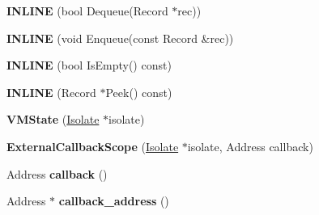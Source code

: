 \begin{DoxyCompactItemize}
\item 
\hypertarget{classv8_1_1internal_1_1_b_a_s_e___e_m_b_e_d_d_e_d_aef824c3518e458f78453d4411fa13506}{}{\bfseries I\+N\+L\+I\+N\+E} (bool Dequeue(Record $\ast$rec))\label{classv8_1_1internal_1_1_b_a_s_e___e_m_b_e_d_d_e_d_aef824c3518e458f78453d4411fa13506}

\item 
\hypertarget{classv8_1_1internal_1_1_b_a_s_e___e_m_b_e_d_d_e_d_a88bd08ad68d4123e4cb879cd97bbbca2}{}{\bfseries I\+N\+L\+I\+N\+E} (void Enqueue(const Record \&rec))\label{classv8_1_1internal_1_1_b_a_s_e___e_m_b_e_d_d_e_d_a88bd08ad68d4123e4cb879cd97bbbca2}

\item 
\hypertarget{classv8_1_1internal_1_1_b_a_s_e___e_m_b_e_d_d_e_d_af2249fffca0874ecc67ea0967f191615}{}{\bfseries I\+N\+L\+I\+N\+E} (bool Is\+Empty() const)\label{classv8_1_1internal_1_1_b_a_s_e___e_m_b_e_d_d_e_d_af2249fffca0874ecc67ea0967f191615}

\item 
\hypertarget{classv8_1_1internal_1_1_b_a_s_e___e_m_b_e_d_d_e_d_a4947bbfad3c24aed7956dd612ee75b25}{}{\bfseries I\+N\+L\+I\+N\+E} (Record $\ast$Peek() const)\label{classv8_1_1internal_1_1_b_a_s_e___e_m_b_e_d_d_e_d_a4947bbfad3c24aed7956dd612ee75b25}

\item 
\hypertarget{classv8_1_1internal_1_1_b_a_s_e___e_m_b_e_d_d_e_d_a2538f9d418fda6abd28c54bc6ae3c9ae}{}{\bfseries V\+M\+State} (\hyperlink{classv8_1_1internal_1_1_isolate}{Isolate} $\ast$isolate)\label{classv8_1_1internal_1_1_b_a_s_e___e_m_b_e_d_d_e_d_a2538f9d418fda6abd28c54bc6ae3c9ae}

\item 
\hypertarget{classv8_1_1internal_1_1_b_a_s_e___e_m_b_e_d_d_e_d_a19859af169553b44163bdaa766516c32}{}{\bfseries External\+Callback\+Scope} (\hyperlink{classv8_1_1internal_1_1_isolate}{Isolate} $\ast$isolate, Address callback)\label{classv8_1_1internal_1_1_b_a_s_e___e_m_b_e_d_d_e_d_a19859af169553b44163bdaa766516c32}

\item 
\hypertarget{classv8_1_1internal_1_1_b_a_s_e___e_m_b_e_d_d_e_d_aa4942df0d30d465c2fa57a7dd5a3b9f9}{}Address {\bfseries callback} ()\label{classv8_1_1internal_1_1_b_a_s_e___e_m_b_e_d_d_e_d_aa4942df0d30d465c2fa57a7dd5a3b9f9}

\item 
\hypertarget{classv8_1_1internal_1_1_b_a_s_e___e_m_b_e_d_d_e_d_a33647f94221caac945ccd3f9fd1adc54}{}Address $\ast$ {\bfseries callback\+\_\+address} ()\label{classv8_1_1internal_1_1_b_a_s_e___e_m_b_e_d_d_e_d_a33647f94221caac945ccd3f9fd1adc54}


\end{DoxyCompactItemize}
